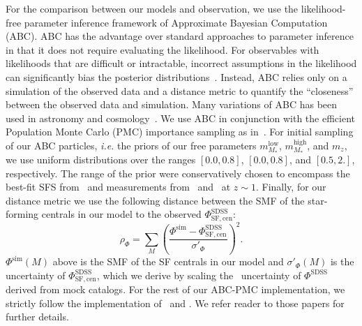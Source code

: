 \documentclass[12pt, letterpaper, preprint, tighten]{aastex62}
\newcommand{\beq}{\begin{equation}}
\newcommand{\eeq}{\end{equation}}
\begin{document}
For the comparison between our models and observation, we use the likelihood-free parameter
inference framework of Approximate Bayesian Computation (ABC). ABC has the
advantage over standard approaches to parameter inference in that it does not
require evaluating the likelihood. For observables with likelihoods that are
difficult or intractable, incorrect assumptions in the likelihood can significantly
bias the posterior distributions~\citep[\emph{e.g.}][]{hahn2018}. Instead,
ABC relies only on a simulation of the observed data and a distance metric to
quantify the ``closeness'' between the observed data and simulation. Many variations
of ABC has been used in astronomy and
cosmology~\citep[\emph{e.g.}][]{cameron2012,weyant2013,ishida2015,alsing2018}.
We use ABC in conjunction with the efficient Population Monte Carlo (PMC)
importance sampling as in~\citep{hahn2017b, hahn2017a}. For initial sampling
of our ABC particles, \emph{i.e.} the priors of our free parameters
$m^\mathrm{low}_{M_*}$, $m^\mathrm{high}_{M_*}$, and $m_z$, we use uniform
distributions over the ranges $[0.0, 0.8]$, $[0.0, 0.8]$, and
$[0.5, 2.]$, respectively. The range of the prior were conservatively chosen
to encompass the best-fit SFS from~\cite{speagle2014}
and measurements from~\cite{moustakas2013} and~\cite{lee2015} at $z \sim 1$.
Finally, for our distance metric we use the following distance between
the SMF of the star-forming centrals in our model to the observed
$\Phi^\mathrm{SDSS}_\mathrm{SF,cen}$:
\beq
\rho_\Phi = \sum\limits_{M} \left( \frac{\Phi^\mathrm{sim} - \Phi^\mathrm{SDSS}_\mathrm{SF,cen}}{\sigma'_\Phi}\right)^2.
\eeq
$\Phi^\mathrm{sim}(M)$ above is the SMF of the SF centrals in our model
and $\sigma'_\Phi(M)$ is the uncertainty of $\Phi^\mathrm{SDSS}_\mathrm{SF,cen}$,
which we derive by scaling the~\cite{li2009} uncertainty of $\Phi^\mathrm{SDSS}$
derived from mock catalogs. %
For the rest of our ABC-PMC implementation, we strictly follow the implementation
of~\cite{hahn2017a} and \cite{hahn2017b}. We refer reader to those papers for
further details.
\end{document}
